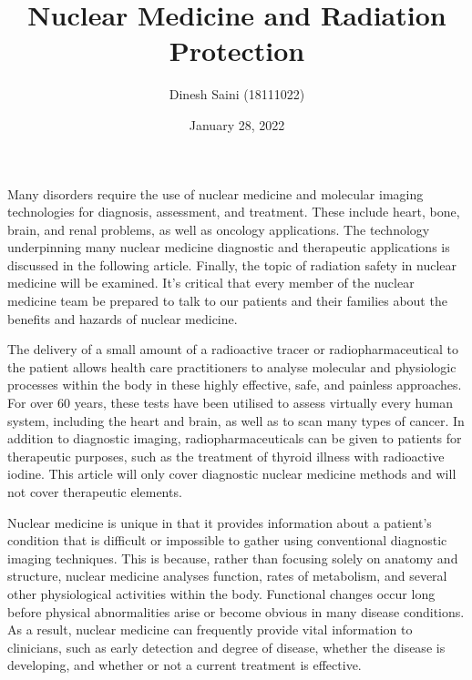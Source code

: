 \documentclass[12pt]{article}
\begin{document}
\title{Nuclear Medicine and Radiation Protection}
\author{Dinesh Saini (18111022)}
\date{January 28, 2022}
\maketitle



Many disorders require the use of nuclear medicine and molecular imaging technologies for diagnosis, assessment, and treatment. These include heart, bone, brain, and renal problems, as well as oncology applications. The technology underpinning many nuclear medicine diagnostic and therapeutic applications is discussed in the following article. Finally, the topic of radiation safety in nuclear medicine will be examined. It's critical that every member of the nuclear medicine team be prepared to talk to our patients and their families about the benefits and hazards of nuclear medicine.
\par
The delivery of a small amount of a radioactive tracer or radiopharmaceutical to the patient allows health care practitioners to analyse molecular and physiologic processes within the body in these highly effective, safe, and painless approaches. For over 60 years, these tests have been utilised to assess virtually every human system, including the heart and brain, as well as to scan many types of cancer. In addition to diagnostic imaging, radiopharmaceuticals can be given to patients for therapeutic purposes, such as the treatment of thyroid illness with radioactive iodine. This article will only cover diagnostic nuclear medicine methods and will not cover therapeutic elements.
\par
Nuclear medicine is unique in that it provides information about a patient's condition that is difficult or impossible to gather using conventional diagnostic imaging techniques. This is because, rather than focusing solely on anatomy and structure, nuclear medicine analyses function, rates of metabolism, and several other physiological activities within the body. Functional changes occur long before physical abnormalities arise or become obvious in many disease conditions. As a result, nuclear medicine can frequently provide vital information to clinicians, such as early detection and degree of disease, whether the disease is developing, and whether or not a current treatment is effective.
\end{document}
